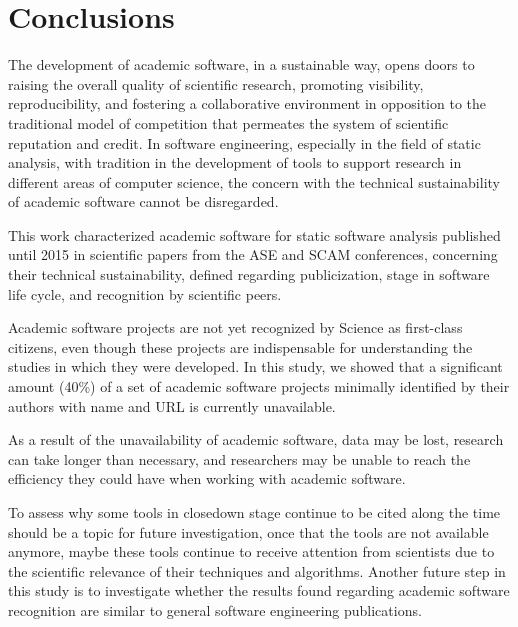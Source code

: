 \section{Conclusions} \label{sec:conclusions}

The development of academic software, in a sustainable way, opens doors to
raising the overall quality of scientific research, promoting visibility,
reproducibility, and fostering a collaborative environment in opposition to the
traditional model of competition that permeates the system of scientific
reputation and credit.
%
In software engineering, especially in the field of static analysis, with
tradition in the development of tools to support research in different areas of
computer science, the concern with the technical sustainability of academic
software cannot be disregarded.

This work characterized academic software for static software analysis
published until 2015 in scientific papers from the ASE and SCAM conferences,
concerning their technical sustainability, defined regarding publicization,
stage in software life cycle, and recognition by scientific peers.

Academic software projects are not yet recognized by Science as first-class
citizens, even though these projects are indispensable for understanding the
studies in which they were developed. In this study, we showed that a
significant amount (40\%) of a set of academic software projects minimally
identified by their authors with name and URL is currently unavailable.

As a result of the unavailability of academic software, 
data may be lost, research can take longer than necessary, 
and researchers may be unable to reach the efficiency
they could have when working with academic software.

To assess why some tools in closedown stage continue to be cited along the time should be a topic for future investigation, once that the tools are not available anymore, maybe these tools continue to receive attention from scientists due to the scientific relevance of their techniques and algorithms.
%
Another future step in this study is to investigate whether the results found regarding academic software recognition are similar to general software engineering publications.

